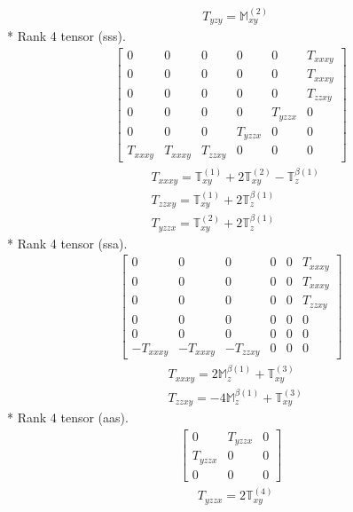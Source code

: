 \documentclass[fleqn,8pt,landscape]{jsarticle}
\begin{document}
\begin{align*}
& T_{yzy} = \mathbb{M}_{xy}^{(2)}
\end{align*}
* Rank 4 tensor (sss).
\begin{align*}
\begin{bmatrix} 0 & 0 & 0 & 0 & 0 & T_{xxxy} \\ 0 & 0 & 0 & 0 & 0 & T_{xxxy} \\ 0 & 0 & 0 & 0 & 0 & T_{zzxy} \\ 0 & 0 & 0 & 0 & T_{yzzx} & 0 \\ 0 & 0 & 0 & T_{yzzx} & 0 & 0 \\ T_{xxxy} & T_{xxxy} & T_{zzxy} & 0 & 0 & 0 \end{bmatrix}
\end{align*}
\begin{align*}
& T_{xxxy} = \mathbb{T}_{xy}^{(1)} + 2 \mathbb{T}_{xy}^{(2)} - \mathbb{T}_{z}^{\beta(1)} \\
& T_{zzxy} = \mathbb{T}_{xy}^{(1)} + 2 \mathbb{T}_{z}^{\beta(1)} \\
& T_{yzzx} = \mathbb{T}_{xy}^{(2)} + 2 \mathbb{T}_{z}^{\beta(1)}
\end{align*}
* Rank 4 tensor (ssa).
\begin{align*}
\begin{bmatrix} 0 & 0 & 0 & 0 & 0 & T_{xxxy} \\ 0 & 0 & 0 & 0 & 0 & T_{xxxy} \\ 0 & 0 & 0 & 0 & 0 & T_{zzxy} \\ 0 & 0 & 0 & 0 & 0 & 0 \\ 0 & 0 & 0 & 0 & 0 & 0 \\ - T_{xxxy} & - T_{xxxy} & - T_{zzxy} & 0 & 0 & 0 \end{bmatrix}
\end{align*}
\begin{align*}
& T_{xxxy} = 2 \mathbb{M}_{z}^{\beta(1)} + \mathbb{T}_{xy}^{(3)} \\
& T_{zzxy} = - 4 \mathbb{M}_{z}^{\beta(1)} + \mathbb{T}_{xy}^{(3)}
\end{align*}
* Rank 4 tensor (aas).
\begin{align*}
\begin{bmatrix} 0 & T_{yzzx} & 0 \\ T_{yzzx} & 0 & 0 \\ 0 & 0 & 0 \end{bmatrix}
\end{align*}
\begin{align*}
& T_{yzzx} = 2 \mathbb{T}_{xy}^{(4)}
\end{align*}
\end{document}
